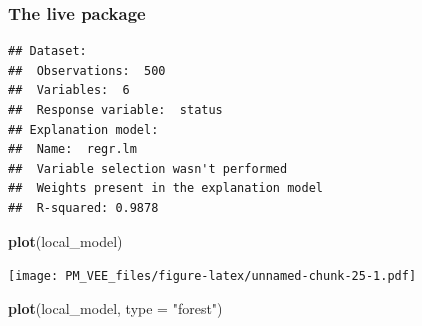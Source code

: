 \documentclass[]{krantz}
\newenvironment{Shaded}{\begin{snugshade}}{\end{snugshade}}
\newcommand{\ControlFlowTok}[1]{\textcolor[rgb]{0.13,0.29,0.53}{\textbf{#1}}}
\newcommand{\DataTypeTok}[1]{\textcolor[rgb]{0.13,0.29,0.53}{#1}}
\newcommand{\DecValTok}[1]{\textcolor[rgb]{0.00,0.00,0.81}{#1}}
\newcommand{\KeywordTok}[1]{\textcolor[rgb]{0.13,0.29,0.53}{\textbf{#1}}}
\newcommand{\NormalTok}[1]{#1}
\newcommand{\OperatorTok}[1]{\textcolor[rgb]{0.81,0.36,0.00}{\textbf{#1}}}
\newcommand{\StringTok}[1]{\textcolor[rgb]{0.31,0.60,0.02}{#1}}
\theoremstyle{definition}
\theoremstyle{definition}
\theoremstyle{definition}
\theoremstyle{remark}
\begin{document}
\hypertarget{the-live-package}{%
\subsubsection{\texorpdfstring{\textbf{The live
package}}{The live package}}\label{the-live-package}}

\begin{Shaded}
\end{Shaded}

\begin{verbatim}
## Dataset: 
##  Observations:  500 
##  Variables:  6 
##  Response variable:  status 
## Explanation model: 
##  Name:  regr.lm 
##  Variable selection wasn't performed 
##  Weights present in the explanation model 
##  R-squared: 0.9878
\end{verbatim}

\begin{Shaded}
\begin{Highlighting}[]
\KeywordTok{plot}\NormalTok{(local_model)}
\end{Highlighting}
\end{Shaded}

\texttt{[image: PM\_VEE\_files/figure-latex/unnamed-chunk-25-1.pdf]}

\begin{Shaded}
\begin{Highlighting}[]
\KeywordTok{plot}\NormalTok{(local_model, }\DataTypeTok{type =} \StringTok{"forest"}\NormalTok{)}
\end{Highlighting}
\end{Shaded}
\end{document}
